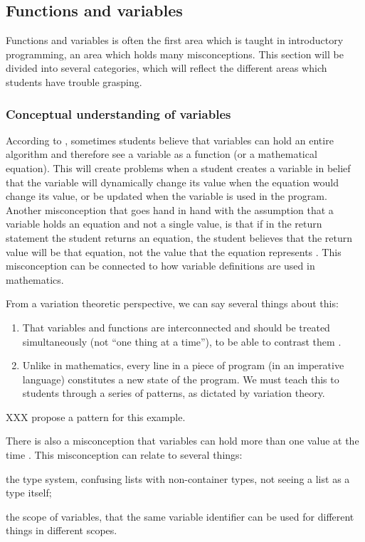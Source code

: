 \subsection{Functions and variables}

Functions and variables is often the first area which is taught in 
introductory programming, an area which holds many misconceptions. This 
section will be divided into several categories, which will reflect the 
different areas which students have trouble grasping.  


\subsubsection{Conceptual understanding of variables}
According to \textcite{
Kohn2017VariableEvaluation,Plass2015Variables,Doukakis2007}, 
sometimes students believe that variables can hold an entire algorithm and 
therefore see a variable as a function (or a mathematical equation). This 
will 
create problems when a student creates a variable in belief that the 
variable 
will dynamically change its value when the equation would change its value, 
or be updated
when the variable is used in the program. Another misconception that goes 
hand in hand with the assumption that a 
variable holds an equation and not a single value, is that if in the return 
statement the student returns an equation, the student believes that the 
return 
value will be that equation, not the value that the equation represents 
\parencite{Kohn2017VariableEvaluation}.
This misconception can be 
connected to how variable definitions are used in mathematics. 

From a variation theoretic perspective, we can say several things about this:
\begin{enumerate}
  \item That variables and functions are interconnected and should be 
treated 
    simultaneously (not \enquote{one thing at a time}), to be able to 
contrast 
    them \parencite[\cf][Ch~6, pp~167--168]{NCOL}.
  \item Unlike in mathematics, every line in a piece of program (in an 
    imperative language) constitutes a new state of the program.
    We must teach this to students through a series of patterns, as 
dictated by 
    variation theory.
\end{enumerate}

XXX propose a pattern for this example.

There is also a misconception that variables can hold more than one value at 
the time \parencite{Doukakis2007}.
This misconception can relate to several things:
\begin{enumerate*}
  \item the type system, confusing lists with non-container types, not 
seeing a 
    list as a type itself;
  \item the scope of variables, that the same variable identifier can be 
used 
    for different things in different scopes.
\end{enumerate*}


